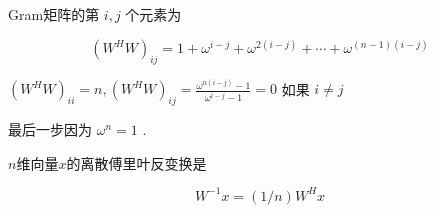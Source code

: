 \begin{corollary}
    Gram矩阵的第 $ i, j $ 个元素为

    \begin{equation} \left(W^{H} W\right)_{i j}=1+\omega^{i-j}+\omega^{2(i-j)}+\cdots+\omega^{(n-1)(i-j)} \end{equation}
    
$ \left(W^{H} W\right)_{i i}=n, \left(W^{H} W\right)_{i j}=\frac{\omega^{n(i-j)}-1}{\omega^{i-j}-1}=0 $ 如果 $ i \neq j $

最后一步因为 $ \omega^{n}=1 $ .
\end{corollary}

\begin{definition}[离散傅里叶反变换]
    $n$维向量$x$的离散傅里叶反变换是 

    \begin{equation} W^{-1} x=(1 / n) W^{H} x \end{equation}
\end{definition}